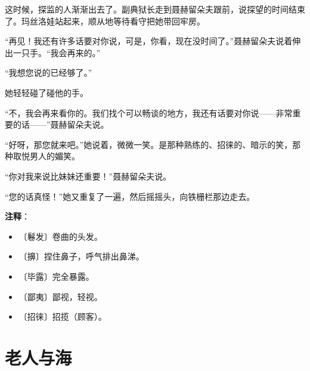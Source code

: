 \documentclass[12pt,UTF-8,openany]{ctexbook}
\begin{document}
\begin{large}
    这时候，探监的人渐渐出去了。副典狱长走到聂赫留朵夫跟前，说探望的时间结束了。玛丝洛娃站起来，顺从地等待看守把她带回牢房。
    
    “再见！我还有许多话要对你说，可是，你看，现在没时间了。”聂赫留朵夫说着伸出一只手。“我会再来的。”
    
    “我想您说的已经够了。”
    
    她轻轻碰了碰他的手。
    
    “不，我会再来看你的。我们找个可以畅谈的地方，我还有话要对你说——非常重要的话——”聂赫留朵夫说。
    
    “好呀，那您就来吧。”她说着，微微一笑。是那种熟练的、招徕的、暗示的笑，那种取悦男人的媚笑。
    
    “你对我来说比妹妹还重要！”聂赫留朵夫说。
    
    “您的话真怪！”她又重复了一遍，然后摇摇头，向铁栅栏那边走去。
    
\end{large}


\newpage

\textbf{注释}：

\vspace{-1em}

\begin{itemize}
    \setlength\itemsep{-0.2em}
    \item 〔鬈发〕卷曲的头发。
    \item 〔擤〕捏住鼻子，呼气排出鼻涕。
    \item 〔毕露〕完全暴露。
    \item 〔鄙夷〕鄙视，轻视。
    \item 〔招徕〕招揽（顾客）。
\end{itemize}

\chapter{老人与海}
\end{document}
